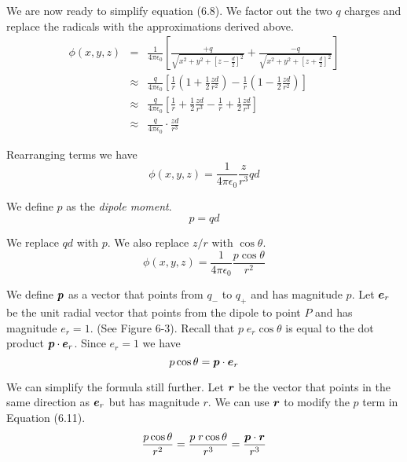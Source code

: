 We are now ready to simplify equation (6.8).
We factor out the two $q$ charges and replace the radicals 
with the approximations derived above.
\begin{eqnarray*}
  \phi(x,y,z)
  &=& \frac{1}{4\pi\epsilon_0}
  \left[ \frac{+q}{\sqrt{x^2 + y^2 + [z - \frac{d}{2}]^2}} + 
    \frac{-q}{\sqrt{x^2 + y^2 + [z + \frac{d}{2}]^2}} \right] \\
  &\approx& \frac{q}{4\pi\epsilon_0}
  \left[ \frac{1}{r} \left(1+\frac{1}{2} \frac{zd}{r^2} \right) -
    \frac{1}{r} \left(1-\frac{1}{2} \frac{zd}{r^2} \right) \right] \\
  &\approx& \frac{q}{4\pi\epsilon_0}
  \left[ \frac{1}{r} + \frac{1}{2} \frac{zd}{r^3} - 
    \frac{1}{r} + \frac{1}{2} \frac{zd}{r^3} \right] \\
  &\approx& \frac{q}{4\pi\epsilon_0} \cdot \frac{zd}{r^3}
\end{eqnarray*}

Rearranging terms we have
\begin{equation}
  \phi(x,y,z) = \frac{1}{4\pi\epsilon_0} \frac{z}{r^3} qd
\end{equation}

We define $p$ as the \emph{dipole moment}.
\begin{equation}
  p = qd
\end{equation}

We replace $qd$ with $p$. We also replace $z/r$ with $\cos\theta$.
\begin{equation}
  \phi(x,y,z) = \frac{1}{4\pi\epsilon_0} \frac{p \cos\theta}{r^2}
\end{equation}

We define $\boldsymbol{p}$ as a vector that points from $q_-$ to $q_+$ and has magnitude $p$.
Let $\boldsymbol{e}_r$ be the unit radial vector that points from the dipole to point $P$ 
and has magnitude $e_r=1$. (See Figure 6-3).
Recall that $p\;e_r\cos\theta$ is equal to the dot product $\boldsymbol{p}\cdot\boldsymbol{e}_r$.
Since $e_r=1$ we have
\begin{equation}
  p \cos \theta = \boldsymbol{p} \cdot \boldsymbol{e}_r
\end{equation}

We can simplify the formula still further.
Let $\boldsymbol{r}$ be the vector that points in the same direction as $\boldsymbol{e}_r$ but has magnitude $r$.
We can use $\boldsymbol{r}$ to modify the $p$ term in Equation (6.11).
\begin{equation*}
  \frac{p\cos\theta}{r^2} = \frac{p\;r\cos\theta}{r^3} = \frac{\boldsymbol{p}\cdot\boldsymbol{r}}{r^3}
\end{equation*}

